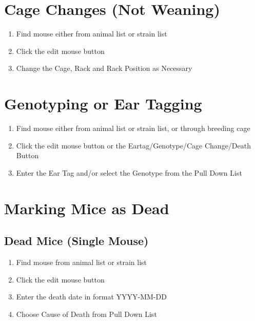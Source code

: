 \documentclass[letterpaper,10pt,english]{sphinxmanual}
\begin{document}
\section{Cage Changes (Not Weaning)}
\label{usage:cage-changes-not-weaning}\begin{enumerate}
\item {} 
Find mouse either from animal list or strain list

\item {} 
Click the edit mouse button

\item {} 
Change the Cage, Rack and Rack Position as Necessary

\end{enumerate}


\section{Genotyping or Ear Tagging}
\label{usage:genotyping-or-ear-tagging}\begin{enumerate}
\item {} 
Find mouse either from animal list or strain list, or through breeding cage

\item {} 
Click the edit mouse button or the Eartag/Genotype/Cage Change/Death Button

\item {} 
Enter the Ear Tag and/or select the Genotype from the Pull Down List

\end{enumerate}


\section{Marking Mice as Dead}
\label{usage:marking-mice-as-dead}

\subsection{Dead Mice (Single Mouse)}
\label{usage:dead-mice-single-mouse}\begin{enumerate}
\item {} 
Find mouse from animal list or strain list

\item {} 
Click the edit mouse button

\item {} 
Enter the death date in format YYYY-MM-DD

\item {} 
Choose Cause of Death from Pull Down List

\end{enumerate}
\end{document}

